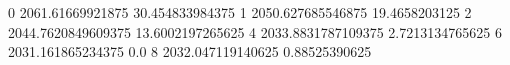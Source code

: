 0 2061.61669921875 30.454833984375
1 2050.627685546875 19.4658203125
2 2044.7620849609375 13.6002197265625
4 2033.8831787109375 2.7213134765625
6 2031.161865234375 0.0
8 2032.047119140625 0.88525390625
